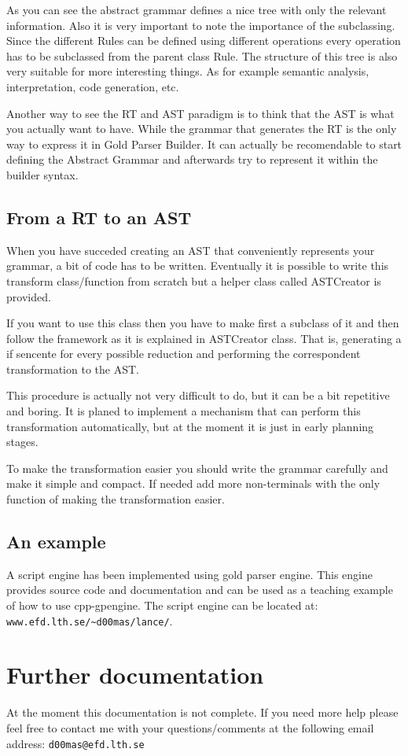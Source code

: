 \documentclass[a4paper]{article}
\begin{document}
As you can see the abstract grammar defines a nice tree with only the relevant information. Also it is very important to note the importance of the subclassing. Since the different Rules can be defined using different operations every operation has to be subclassed from the parent class Rule. The structure of this tree is also very suitable for more interesting things. As for example semantic analysis, interpretation, code generation, etc.

Another way to see the RT and AST paradigm is to think that the AST is what you actually want to have. While the grammar that generates the RT is the only way to express it in Gold Parser Builder. It can actually be recomendable to start defining the Abstract Grammar and afterwards try to represent it within the builder syntax.

\subsection {From a RT to an AST}
When you have succeded creating an AST that conveniently represents your grammar, a bit of code has to be written. Eventually it is possible to write this transform class/function from scratch but a helper class called ASTCreator is provided. 

If you want to use this class then you have to make first a subclass of it and then follow the framework as it is explained in ASTCreator class. That is, generating a if sencente for every possible reduction and performing the correspondent transformation to the AST.

This procedure is actually not very difficult to do, but it can be a bit repetitive and boring. It is planed to implement a mechanism that can perform this transformation automatically, but at the moment it is just in early planning stages.

To make the transformation easier you should write the grammar carefully and make it simple and compact. If needed add more non-terminals with the only function of making the transformation easier.

\subsection {An example}
A script engine has been implemented using gold parser engine. This engine provides source code and documentation and can be used as a teaching example of how to use cpp-gpengine. The script engine can be located at: \verb|www.efd.lth.se/~d00mas/lance/|.

\section {Further documentation}
At the moment this documentation is not complete. If you need more help please feel free to contact me with your questions/comments at the following email address: \verb|d00mas@efd.lth.se|
\end{document}
